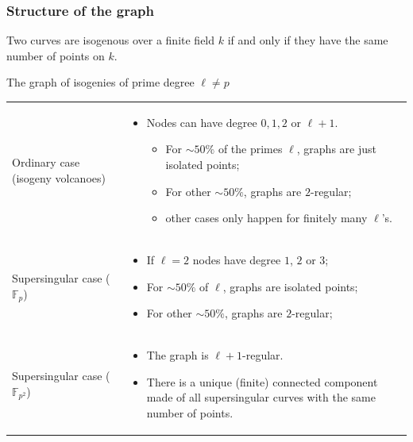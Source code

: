 \documentclass{beamer}
\renewcommand{\emph}[1]{{\usebeamercolor[fg]{structure}#1}}
\newcommand{\F}{\mathbb{F}}
\begin{document}
\begin{frame}
  \frametitle{Structure of the graph}
  
  \begin{theorem}
    Two curves are isogenous over a finite field $k$ if and only if
    they have the \alert{same number of points} on $k$.
  \end{theorem}
  \vspace{-0.6em}
  \begin{block}{The graph of isogenies of \alert{prime} degree \alert{$\ell\ne p$}}
    \small
    \vspace{-1em}
    \begin{tabular}{p{} p{}}
      \raggedright
      \emph{Ordinary case (isogeny volcanoes)}
      & \vspace{-1em}
        \begin{itemize}
          \setlength\itemsep{-0.6ex}
        \item Nodes can have degree \emph{$0,1,2$} or \emph{$\ell+1$}.
          \begin{itemize}
          \item  For $\sim 50\%$ of the primes $\ell$, graphs are just isolated
            points;
          \item For other $\sim 50\%$, graphs are $2$-regular;
          \item other cases only happen for finitely many $\ell$'s.
          \end{itemize}
        \end{itemize}
      \\[-1.4em]
      \raggedright
      \emph{Supersingular case ($\F_p$)}
      & \vspace{-1.2em}
        \begin{itemize}
          \setlength\itemsep{-0.6ex}
        \item If $\ell=2$ nodes have degree $1$, $2$ or $3$;
        \item For $\sim 50\%$ of $\ell$, graphs are isolated points;
        \item For other $\sim 50\%$, graphs are $2$-regular;
        \end{itemize}
      \\[-1em]
      \raggedright
      \emph{Supersingular case ($\F_{p^2}$)}
      & \vspace{-1em}
        \begin{itemize}
          \setlength\itemsep{-0.6ex}
        \item The graph is \emph{$\ell+1$-regular}.
        \item There is a \alert{unique (finite) connected component} made
          of all supersingular curves with the same number of points.
        \end{itemize}
    \end{tabular}
    \vspace{-1.5em}
  \end{block}
\end{frame}
\end{document}

